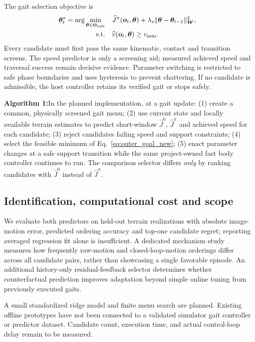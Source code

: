The gait selection objective is
\begin{equation}\label{eq:outer_goal_new}
\begin{aligned}
\bm\theta_t^*=\arg\min_{\bm\theta\in\Theta_{\rm safe}}\quad
&\widehat J^\pi(\bm o_t,\bm\theta)+\lambda_s\|\bm\theta-\bm\theta_{t-1}\|_{\bm W}^2,\\
\mathrm{s.t.}\quad&\widehat v(\bm o_t,\bm\theta)\ge v_{\min}.
\end{aligned}
\end{equation}
Every candidate must first pass the same kinematic, contact and transition screens. The speed predictor is only a screening aid; measured achieved speed and traversal success remain decisive evidence. Parameter switching is restricted to safe phase boundaries and uses hysteresis to prevent chattering. If no candidate is admissible, the host controller retains its verified gait or stops safely.

\noindent\textbf{Algorithm 1:}\enspace In the planned implementation, at a gait update: (1) create a common, physically screened gait menu; (2) use current state and locally available terrain estimates to predict short-window $\widehat J^0$, $\widehat J^\pi$ and achieved speed for each candidate; (3) reject candidates failing speed and support constraints; (4) select the feasible minimum of Eq.~\eqref{eq:outer_goal_new}; (5) enact parameter changes at a safe support transition while the same project-owned fast body controller continues to run. The comparison selector differs \emph{only} by ranking candidates with $\widehat J^0$ instead of $\widehat J^\pi$.

\subsection{Identification, computational cost and scope}
We evaluate both predictors on held-out terrain realizations with absolute image-motion error, predicted ordering accuracy and top-one candidate regret; reporting averaged regression fit alone is insufficient. A dedicated mechanism study measures how frequently raw-motion and closed-loop-motion orderings differ across all candidate pairs, rather than showcasing a single favorable episode. An additional history-only residual-feedback selector determines whether counterfactual prediction improves adaptation beyond simple online tuning from previously executed gaits.

A small standardized ridge model and finite menu search are planned. Existing offline prototypes have not been connected to a validated simulator gait controller or predictor dataset. Candidate count, execution time, and actual control-loop delay remain to be measured.
